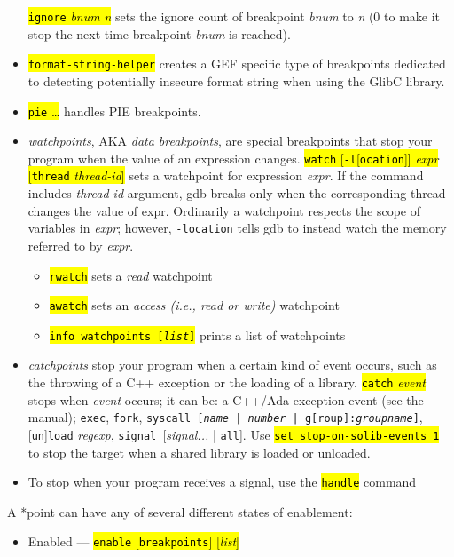 \documentclass[a4paper,landscape]{article}
\newcommand{\hlc}[2][yellow]{{\sethlcolor{#1} \hl{#2}}}
\newcommand{\gef}[1]{\hlc[skyblue]{#1}}
\begin{document}
\begin{multicols*}{3}
\begin{itemize}
\hl{\texttt{ignore} \textit{bnum} \textit{n}} sets the ignore count of breakpoint \textit{bnum} to \textit{n} (0 to make it stop the next time breakpoint \textit{bnum} is reached).
\item \gef{\texttt{format-string-helper}} creates a GEF specific type of breakpoints dedicated to detecting potentially insecure format string when using the GlibC library.
\item \gef{\texttt{pie} \ldots} handles PIE breakpoints.
\item \emph{watchpoints}, AKA \emph{data breakpoints}, are special breakpoints that stop your program when the value of an expression changes.
	\hl{\texttt{watch} [\texttt{-l}[\texttt{ocation}]] \textit{expr} [\texttt{thread} \textit{thread-id}]} sets a watchpoint for expression \textit{expr}.
If the command includes \textit{thread-id} argument, gdb breaks only
when the corresponding thread changes the value of expr.
Ordinarily a watchpoint respects the scope of variables in \textit{expr}; however,
\texttt{-location} tells gdb to instead watch the memory referred to
by \textit{expr}.
	\begin{itemize}
	\item \hl{\texttt{rwatch}} sets a \emph{read} watchpoint
	\item \hl{\texttt{awatch}} sets an \emph{access (i.e., read or write)} watchpoint
	\item \hl{\texttt{info watchpoints [\textit{list}]}} prints a list of watchpoints
	\end{itemize}
\item \emph{catchpoints} stop your program when a certain kind
of event occurs, such as the throwing of a C++ exception or the loading of a library.
\hl{\texttt{catch} \textit{event}} stops when \textit{event} occurs; it can be:
a C++/Ada exception event (see the manual); \texttt{exec}, \texttt{fork},
\texttt{syscall [\textit{name} | \textit{number} | \texttt{g}[\texttt{roup}]:\textit{groupname}]},
[\texttt{un}]\texttt{load} \textit{regexp}, \texttt{signal }[\textit{signal...} | \texttt{all}].
Use \hl{\texttt{set stop-on-solib-events 1}} to stop the target when a shared library is loaded or unloaded.
\item To stop when your program receives a signal, use the \hl{\texttt{handle}} command
\end{itemize}
A *point can have any of several different states of enablement:
\begin{itemize}
\item Enabled --- \hl{\texttt{enable} [\texttt{breakpoints}] [\textit{list}]}

\end{itemize}
\end{multicols*}
\end{document}
